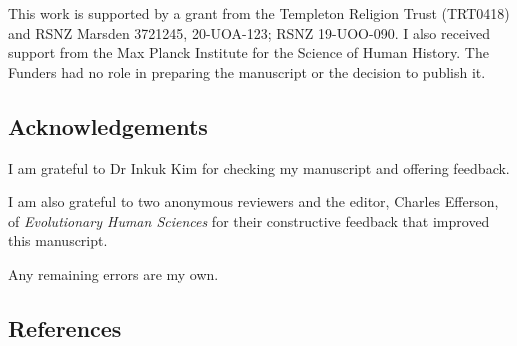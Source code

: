 \documentclass[
  singlecolumn]{article}
\begin{document}
This work is supported by a grant from the Templeton Religion Trust
(TRT0418) and RSNZ Marsden 3721245, 20-UOA-123; RSNZ 19-UOO-090. I also
received support from the Max Planck Institute for the Science of Human
History. The Funders had no role in preparing the manuscript or the
decision to publish it.

\subsection{Acknowledgements}\label{acknowledgements}

I am grateful to Dr Inkuk Kim for checking my manuscript and offering
feedback.

I am also grateful to two anonymous reviewers and the editor, Charles
Efferson, of \emph{Evolutionary Human Sciences} for their constructive
feedback that improved this manuscript.

Any remaining errors are my own.

\subsection{References}\label{references}
\end{document}
